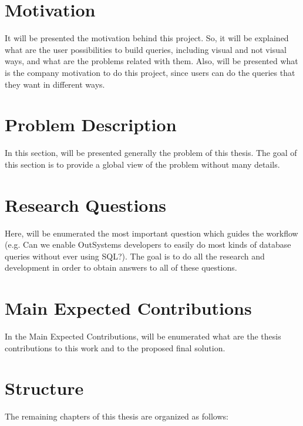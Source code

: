 \section{Motivation}
\label{sec:motivation}
It will be presented the motivation behind this project. So, it will be explained 
what are the user possibilities to build queries, including visual and not 
visual ways, and what are the problems related with them. Also, will be 
presented what is the company motivation to do this project, since users can do 
the queries that they want in different ways.

\section{Problem Description}
\label{sec:problem_description}
In this section, will be presented generally the problem of this thesis. The goal 
of this section is to provide a global view of the problem without many details.

\section{Research Questions}
\label{sec:research_questions}
Here, will be enumerated the most important question which guides the workflow
(e.g. Can we enable OutSystems developers to easily do most kinds of database 
queries without ever using SQL?). The goal is to do all the research and 
development in order to obtain answers to all of these questions.

\section{Main Expected Contributions}
\label{sec:main_exp_contributions}
In the Main Expected Contributions, will be enumerated what are the thesis 
contributions to this work and to the proposed final solution.

\section{Structure}
\label{sec:structure}

The remaining chapters of this thesis are organized as follows:

